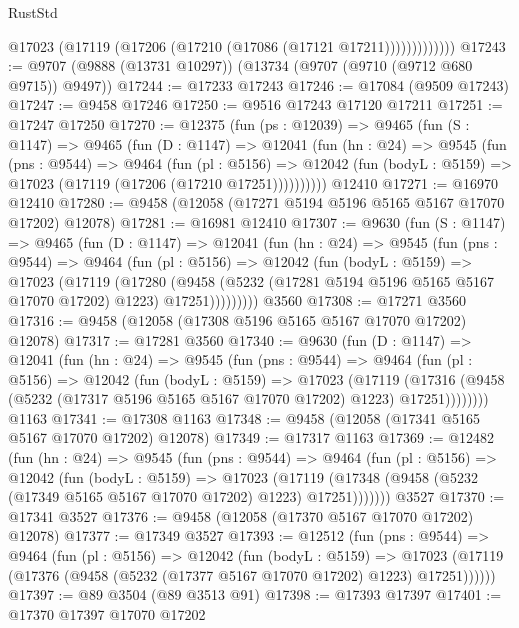 \begin{lexlean}{RustStd}
\begin{coremodule}
                  @17023 (@17119 (@17206 (@17210 (@17086 (@17121 @17211)))))))))))))
@17243 := @9707 (@9888 (@13731 @10297)) (@13734 (@9707 (@9710 (@9712 @680 @9715)) @9497))
@17244 := @17233 @17243
@17246 := @17084 (@9509 @17243)
@17247 := @9458 @17246
@17250 := @9516 @17243 @17120 @17211
@17251 := @17247 @17250
@17270 := @12375
    (fun (ps : @12039) =>
    @9465
      (fun (S : @1147) =>
      @9465
        (fun (D : @1147) =>
        @12041
          (fun (hn : @24) =>
          @9545
            (fun (pns : @9544) =>
            @9464
              (fun (pl : @5156) =>
              @12042 (fun (bodyL : @5159) => @17023 (@17119 (@17206 (@17210 @17251))))))))))
    @12410
@17271 := @16970 @12410
@17280 := @9458 (@12058 (@17271 @5194 @5196 @5165 @5167 @17070 @17202) @12078)
@17281 := @16981 @12410
@17307 := @9630
    (fun (S : @1147) =>
    @9465
      (fun (D : @1147) =>
      @12041
        (fun (hn : @24) =>
        @9545
          (fun (pns : @9544) =>
          @9464
            (fun (pl : @5156) =>
            @12042
              (fun (bodyL : @5159) =>
              @17023
                (@17119
                  (@17280
                    (@9458
                      (@5232 (@17281 @5194 @5196 @5165 @5167 @17070 @17202) @1223)
                      @17251)))))))))
    @3560
@17308 := @17271 @3560
@17316 := @9458 (@12058 (@17308 @5196 @5165 @5167 @17070 @17202) @12078)
@17317 := @17281 @3560
@17340 := @9630
    (fun (D : @1147) =>
    @12041
      (fun (hn : @24) =>
      @9545
        (fun (pns : @9544) =>
        @9464
          (fun (pl : @5156) =>
          @12042
            (fun (bodyL : @5159) =>
            @17023
              (@17119
                (@17316 (@9458 (@5232 (@17317 @5196 @5165 @5167 @17070 @17202) @1223) @17251))))))))
    @1163
@17341 := @17308 @1163
@17348 := @9458 (@12058 (@17341 @5165 @5167 @17070 @17202) @12078)
@17349 := @17317 @1163
@17369 := @12482
    (fun (hn : @24) =>
    @9545
      (fun (pns : @9544) =>
      @9464
        (fun (pl : @5156) =>
        @12042
          (fun (bodyL : @5159) =>
          @17023
            (@17119 (@17348 (@9458 (@5232 (@17349 @5165 @5167 @17070 @17202) @1223) @17251)))))))
    @3527
@17370 := @17341 @3527
@17376 := @9458 (@12058 (@17370 @5167 @17070 @17202) @12078)
@17377 := @17349 @3527
@17393 := @12512
    (fun (pns : @9544) =>
    @9464
      (fun (pl : @5156) =>
      @12042
        (fun (bodyL : @5159) =>
        @17023 (@17119 (@17376 (@9458 (@5232 (@17377 @5167 @17070 @17202) @1223) @17251))))))
@17397 := @89 @3504 (@89 @3513 @91)
@17398 := @17393 @17397
@17401 := @17370 @17397 @17070 @17202

\end{coremodule}
\end{lexlean}

